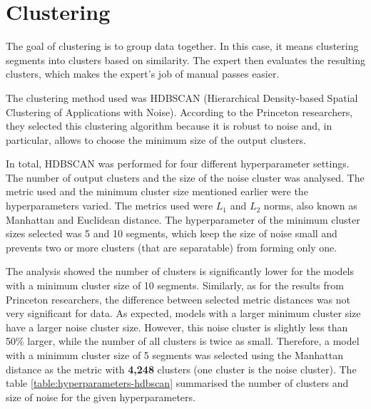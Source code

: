     \section{Clustering}
        The goal of clustering is to group data together. In this case, it means clustering segments into clusters based on similarity. The expert then evaluates the resulting clusters, which makes the expert's job of manual passes easier.

        The clustering method used was HDBSCAN (Hierarchical Density-based Spatial Clustering of Applications with Noise)\cite{hdbscan}. According to the Princeton researchers, they selected this clustering algorithm because it is robust to noise and, in particular, allows to choose the minimum size of the output clusters.

        In total, HDBSCAN was performed for four different hyperparameter settings. The number of output clusters and the size of the noise cluster was analysed.  The metric used and the minimum cluster size mentioned earlier were the hyperparameters varied. The metrics used were $L_{1}$ and $L_{2}$ norms, also known as Manhattan and Euclidean distance. The hyperparameter of the minimum cluster sizes selected was 5 and 10 segments, which keep the size of noise small and prevents two or more clusters (that are separatable) from forming only one.

        The analysis showed the number of clusters is significantly lower for the models with a minimum cluster size of 10 segments. Similarly, as for the results from Princeton researchers, the difference between selected metric distances was not very significant for data. As expected, models with a larger minimum cluster size have a larger noise cluster size. However, this noise cluster is slightly less than 50\% larger, while the number of all clusters is twice as small. Therefore, a model with a minimum cluster size of 5 segments was selected using the Manhattan distance as the metric with \textbf{4,248} clusters (one cluster is the noise cluster). The table \ref{table:hyperparameters-hdbscan} summarised the number of clusters and size of noise for the given hyperparameters. 

